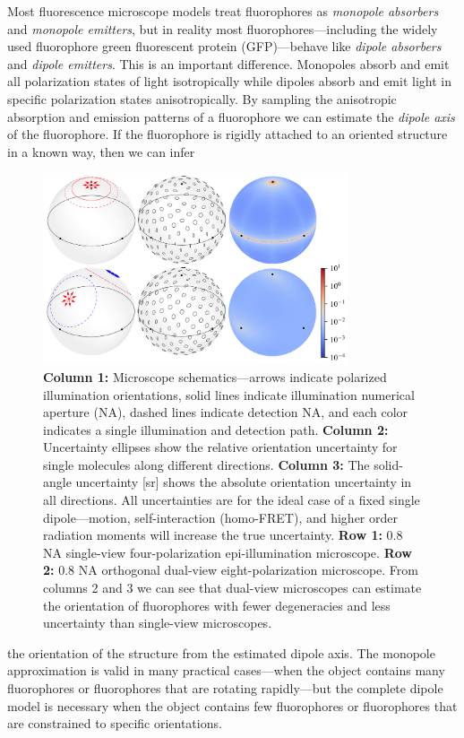 \documentclass[11pt]{article}
\begin{document}
{Most fluorescence microscope models treat fluorophores as \textit{monopole
  absorbers} and \textit{monopole emitters}, but in reality most
fluorophores---including the widely used fluorophore green fluorescent protein
(GFP)---behave like \textit{dipole absorbers} and \textit{dipole emitters}. This
is an important difference. Monopoles absorb and emit all polarization states of
light isotropically while dipoles absorb and emit light in specific polarization
states anisotropically. By sampling the anisotropic absorption and emission
patterns of a fluorophore we can estimate the \textit{dipole axis} of the
fluorophore. If the fluorophore is rigidly attached to an oriented structure in a
known way, then we can infer \parfillskip=0pt\par}
\begin{figure}[H]
\centering
  \includegraphics[width=0.8\textwidth, interpolate=true, trim={0em 0em 0em 0em}]{figs/proposal-fig}
  \caption{\textbf{Column 1:} Microscope schematics---arrows indicate polarized
    illumination orientations, solid lines indicate illumination numerical
    aperture (NA), dashed lines indicate detection NA, and each color indicates
    a single illumination and detection path. \textbf{Column 2:} Uncertainty
    ellipses show the relative orientation uncertainty for single molecules
    along different directions. \textbf{Column 3:} The solid-angle uncertainty
    [sr] shows the absolute orientation uncertainty in all directions. All
    uncertainties are for the ideal case of a fixed single dipole---motion,
    self-interaction (homo-FRET), and higher order radiation moments will
    increase the true uncertainty. \textbf{Row 1:} 0.8 NA single-view
    four-polarization epi-illumination microscope. \textbf{Row 2:} 0.8 NA
    orthogonal dual-view eight-polarization microscope. From columns 2 and 3 we
    can see that dual-view microscopes can estimate the orientation of
    fluorophores with fewer degeneracies and less uncertainty than single-view
    microscopes.}
  \label{fig:comparison}
\end{figure}
\noindent the orientation of the structure from the estimated
dipole axis. The monopole approximation is valid in many practical cases---when
the object contains many fluorophores or fluorophores that are rotating
rapidly---but the complete dipole model is necessary when the object contains
few fluorophores or fluorophores that are constrained to specific orientations.
\end{document}
